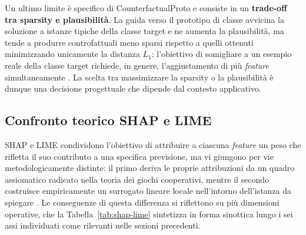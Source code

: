 Un ultimo limite è specifico di CounterfactualProto e consiste in un \textbf{trade-off tra sparsity e plausibilità}. La guida verso il prototipo di classe avvicina la soluzione a istanze tipiche della classe target e ne aumenta la plausibilità, ma tende a produrre controfattuali meno sparsi rispetto a quelli ottenuti minimizzando unicamente la distanza $L_1$: l'obiettivo di somigliare a un esempio reale della classe target richiede, in genere, l'aggiustamento di più \textit{feature} simultaneamente \cite{vanlooveren2021counterfactualproto}. La scelta tra massimizzare la sparsity o la plausibilità è dunque una decisione progettuale che dipende dal contesto applicativo.

\subsection{Confronto teorico SHAP e LIME}

SHAP e LIME condividono l'obiettivo di attribuire a ciascuna \textit{feature} un peso che rifletta il suo contributo a una specifica previsione, ma vi giungono per vie metodologicamente distinte: il primo deriva le proprie attribuzioni da un quadro assiomatico radicato nella teoria dei giochi cooperativi, mentre il secondo costruisce empiricamente un surrogato lineare locale nell'intorno dell'istanza da spiegare \cite{lundberg2017unified, ribeiro2016why}. Le conseguenze di questa differenza si riflettono su più dimensioni operative, che la Tabella~\ref{tab:shap-lime} sintetizza in forma sinottica lungo i sei assi individuati come rilevanti nelle sezioni precedenti.

